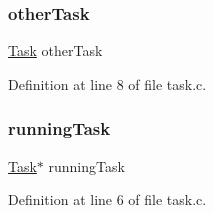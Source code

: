 \subsubsection{\texorpdfstring{other\+Task}{otherTask}}
{\footnotesize\ttfamily \hyperlink{a00134}{Task} other\+Task\hspace{0.3cm}{\ttfamily [static]}}



Definition at line 8 of file task.\+c.

\mbox{\label{a00044_a2c195d425b4a6791b3a89f7b219f93d9_a2c195d425b4a6791b3a89f7b219f93d9}} 
\subsubsection{\texorpdfstring{running\+Task}{runningTask}}
{\footnotesize\ttfamily \hyperlink{a00134}{Task}$\ast$ running\+Task\hspace{0.3cm}{\ttfamily [static]}}



Definition at line 6 of file task.\+c.

